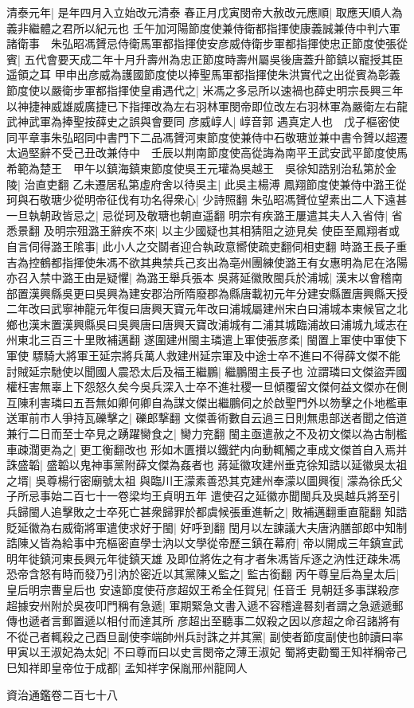 清泰元年|{
	是年四月入立始改元清泰}
春正月戊寅閔帝大赦改元應順|{
	取應天順人為義非繼體之君所以紀元也}
壬午加河陽節度使兼侍衛都指揮使康義誠兼侍中判六軍諸衛事　朱弘昭馮贇忌侍衛馬軍都指揮使安彦威侍衛步軍都指揮使忠正節度使張從賓|{
	五代會要天成二年十月升壽州為忠正節度時壽州屬吳後唐蓋升節鎮以寵授其臣遥領之耳}
甲申出彦威為護國節度使以捧聖馬軍都指揮使朱洪實代之出從賓為彰義節度使以嚴衛步軍都指揮使皇甫遇代之|{
	米馮之多忌所以速禍也薛史明宗長興三年以神捷神威雄威廣捷已下指揮改為左右羽林軍閔帝即位改左右羽林軍為嚴衛左右龍武神武軍為捧聖按薛史之誤與會要同}
彦威崞人|{
	崞音郭}
遇真定人也　戊子樞密使同平章事朱弘昭同中書門下二品馮贇河東節度使兼侍中石敬瑭並兼中書令贇以超遷太過堅辭不受己丑改兼侍中　壬辰以荆南節度使高從誨為南平王武安武平節度使馬希範為楚王　甲午以鎮海鎮東節度使吳王元瓘為吳越王　吳徐知誥别治私第於金陵|{
	治直吏翻}
乙未遷居私第虛府舍以待吳主|{
	此吳主楊溥}
鳳翔節度使兼侍中潞王從珂與石敬瑭少從明帝征伐有功名得衆心|{
	少詩照翻}
朱弘昭馮贇位望素出二人下遠甚一旦執朝政皆忌之|{
	忌從珂及敬瑭也朝直遥翻}
明宗有疾潞王屢遣其夫人入省侍|{
	省悉景翻}
及明宗殂潞王辭疾不來|{
	以主少國疑也其相猜阻之迹見矣}
使臣至鳳翔者或自言伺得潞王隂事|{
	此小人之交鬬者迎合執政意嚮使疏吏翻伺相吏翻}
時潞王長子重吉為控鶴都指揮使朱馮不欲其典禁兵己亥出為亳州團練使潞王有女惠明為尼在洛陽亦召入禁中潞王由是疑懼|{
	為潞王舉兵張本}
吳蔣延徽敗閩兵於浦城|{
	漢末以會稽南部置漢興縣吳更曰吳興為建安郡治所隋廢郡為縣唐載初元年分建安縣置唐興縣天授二年改曰武寧神龍元年復曰唐興天寶元年改曰浦城屬建州宋白曰浦城本東候官之北鄉也漢末置漢興縣吳曰吳興唐曰唐興天寶改浦城有二浦其城臨浦故曰浦城九域志在州東北三百三十里敗補邁翻}
遂圍建州閩主璘遣上軍使張彦柔|{
	閩置上軍使中軍使下軍使}
驃騎大將軍王延宗將兵萬人救建州延宗軍及中途士卒不進曰不得薛文傑不能討賊延宗馳使以聞國人震恐太后及福王繼鵬|{
	繼鵬閩主長子也}
泣謂璘曰文傑盜弄國權枉害無辜上下怨怒久矣今吳兵深入士卒不進社稷一旦傾覆留文傑何益文傑亦在側互陳利害璘曰五吾無如卿何卿自為謀文傑出繼鵬伺之於啟聖門外以笏擊之仆地檻車送軍前市人爭持瓦礫擊之|{
	礫郎撃翻}
文傑善術數自云過三日則無患部送者聞之倍道兼行二日而至士卒見之踴躍臠食之|{
	臠力兖翻}
閩主亟遣赦之不及初文傑以為古制檻車疎濶更為之|{
	更工衡翻改也}
形如木匱攅以鐵鋩内向動輒觸之車成文傑首自入焉并誅盛韜|{
	盛韜以鬼神事黨附薛文傑為姦者也}
蔣延徽攻建州垂克徐知誥以延徽吳太祖之壻|{
	吳尊楊行密廟號太祖}
與臨川王濛素善恐其克建州奉濛以圖興復|{
	濛為徐氏父子所忌事始二百七十一卷梁均王貞明五年}
遣使召之延徽亦聞閩兵及吳越兵將至引兵歸閩人追擊敗之士卒死亡甚衆歸罪於都虞候張重進斬之|{
	敗補邁翻重直龍翻}
知誥貶延徽為右威衛將軍遣使求好于閩|{
	好呼到翻}
閏月以左諫議大夫唐汭膳部郎中知制誥陳乂皆為給事中充樞密直學士汭以文學從帝歷三鎮在幕府|{
	帝以開成三年鎮宣武明年徙鎮河東長興元年徙鎮天雄}
及即位將佐之有才者朱馮皆斥逐之汭性迂疎朱馮恐帝含怒有時而發乃引汭於密近以其黨陳乂監之|{
	監古銜翻}
丙午尊皇后為皇太后|{
	皇后明宗曹皇后也}
安遠節度使苻彦超奴王希全任賀兒|{
	任音壬}
見朝廷多事謀殺彦超據安州附於吳夜叩門稱有急遞|{
	軍期緊急文書入遞不容稽違晷刻者謂之急遞遞郵傳也遞者言郵置遞以相付而達其所}
彦超出至聽事二奴殺之因以彦超之命召諸將有不從己者輒殺之己酉旦副使李端帥州兵討誅之并其黨|{
	副使者節度副使也帥讀曰率}
甲寅以王淑妃為太妃|{
	不曰尊而曰以史言閔帝之薄王淑妃}
蜀將吏勸蜀王知祥稱帝己巳知祥即皇帝位于成都|{
	孟知祥字保胤邢州龍岡人}


資治通鑑卷二百七十八
